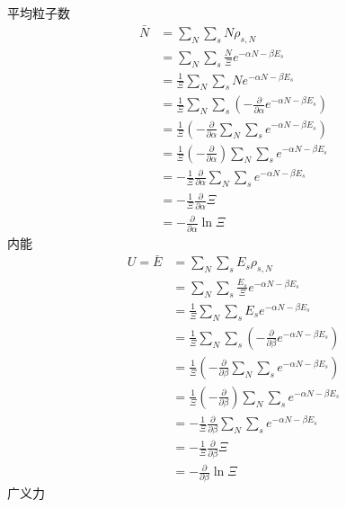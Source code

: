 平均粒子数
\begin{equation}
    \begin{aligned}
        \bar{N}&=\sum_N{\sum_s{N\rho _{s,N}}}
\\
&=\sum_N{\sum_s{\frac{N}{\varXi}e^{-\alpha N-\beta E_s}}}
\\
&=\frac{1}{\varXi}\sum_N{\sum_s{Ne^{-\alpha N-\beta E_s}}}
\\
&=\frac{1}{\varXi}\sum_N{\sum_s{\left( -\frac{\partial}{\partial \alpha}e^{-\alpha N-\beta E_s} \right)}}
\\
&=\frac{1}{\varXi}\left( -\frac{\partial}{\partial \alpha}\sum_N{\sum_s{e^{-\alpha N-\beta E_s}}} \right) 
\\
&=\frac{1}{\varXi}\left( -\frac{\partial}{\partial \alpha} \right) \sum_N{\sum_s{e^{-\alpha N-\beta E_s}}}
\\
&=-\frac{1}{\varXi}\frac{\partial}{\partial \alpha}\sum_N{\sum_s{e^{-\alpha N-\beta E_s}}}
\\
&=-\frac{1}{\varXi}\frac{\partial}{\partial \alpha}\varXi 
\\
&=-\frac{\partial}{\partial \alpha}\ln \varXi 
    \end{aligned}
\end{equation}
内能
\begin{equation}
    \begin{aligned}
        U=\bar{E}&=\sum_N{\sum_s{E_s\rho _{s,N}}}
\\
&=\sum_N{\sum_s{\frac{E_s}{\varXi}e^{-\alpha N-\beta E_s}}}
\\
&=\frac{1}{\varXi}\sum_N{\sum_s{E_se^{-\alpha N-\beta E_s}}}
\\
&=\frac{1}{\varXi}\sum_N{\sum_s{\left( -\frac{\partial}{\partial \beta}e^{-\alpha N-\beta E_s} \right)}}
\\
&=\frac{1}{\varXi}\left( -\frac{\partial}{\partial \beta}\sum_N{\sum_s{e^{-\alpha N-\beta E_s}}} \right) 
\\
&=\frac{1}{\varXi}\left( -\frac{\partial}{\partial \beta} \right) \sum_N{\sum_s{e^{-\alpha N-\beta E_s}}}
\\
&=-\frac{1}{\varXi}\frac{\partial}{\partial \beta}\sum_N{\sum_s{e^{-\alpha N-\beta E_s}}}
\\
&=-\frac{1}{\varXi}\frac{\partial}{\partial \beta}\varXi 
\\
&=-\frac{\partial}{\partial \beta}\ln \varXi 
    \end{aligned}
\end{equation}
广义力
